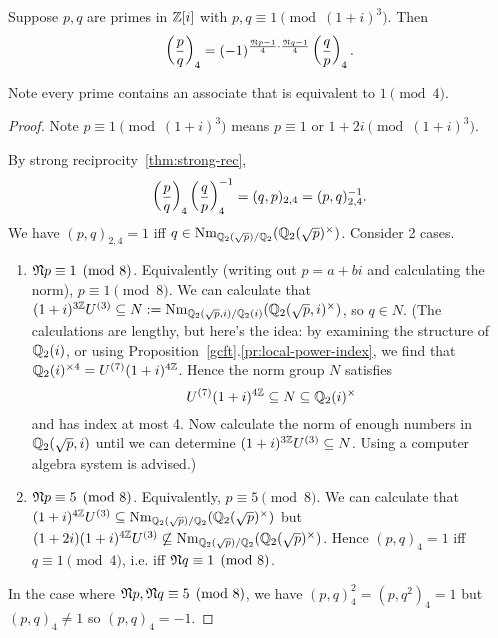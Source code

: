 \begin{thm}
Suppose $p,q$ are primes in $\mathbb{Z}[i]$ with $p,q\equiv 1\pmod{(1+i)^3}$. Then
\[
\left( {\frac{p}{q}} \right)_4=(-1)^{\frac{\mathfrak{N} p-1}{4}\cdot \frac{\mathfrak{N} q-1}{4}}\left( {\frac{q}{p}} \right)_4.
\]
\end{thm}
Note every prime contains an associate that is equivalent to $1\pmod{4}$.
\begin{proof}
Note $p\equiv 1\pmod{(1+i)^3}$ means $p\equiv1$ or $1+2i\pmod{(1+i)^3}$. 

By strong reciprocity~\ref{thm:strong-rec}, 
\[\left( {\frac{p}{q}} \right)_4\left( {\frac{q}{p}} \right)_4^{-1}=(q,p)_{2,4}=(p,q)_{2,4}^{-1}.\]
We have $(p,q)_{2,4}=1$ iff $q\in \operatorname{Nm}_{\mathbb{Q}_2(\sqrt p)/\mathbb{Q}_2}(\mathbb{Q}_2(\sqrt p)^{\times})$. %
Consider 2 cases.
\begin{enumerate}
\item $\mathfrak{N} p\equiv 1\pmod 8$. Equivalently (writing out $p=a+bi$ and calculating the norm), $p\equiv 1\pmod 8$. %
We can calculate %
that $(1+i)^{3\mathbb{Z}}U^{(3)}\subseteq N:=\operatorname{Nm}_{\mathbb{Q}_2(\sqrt p,i)/\mathbb{Q}_2(i)}(\mathbb{Q}_2(\sqrt p,i)^{\times})$, so $q\in N$. (The calculations are lengthy, but here's the idea: by examining the structure of $\mathbb{Q}_2(i)$, or using Proposition~\ref{gcft}.\ref{pr:local-power-index}, we find that $\mathbb{Q}_2(i)^{\times 4}=U^{(7)}(1+i)^{4\mathbb{Z}}$. %
 Hence the norm group $N$ satisfies
\[
U^{(7)}(1+i)^{4\mathbb{Z}}\subseteq N\subseteq \mathbb{Q}_2(i)^{\times}
\]
and has index at most 4. 
Now calculate the norm of enough numbers in $\mathbb{Q}_2(\sqrt p,i)$ until we can determine $(1+i)^{3\mathbb{Z}}U^{(3)}\subseteq N$. Using a computer algebra system is advised.)
\item $\mathfrak{N} p\equiv 5\pmod 8$. Equivalently, $p\equiv 5\pmod 8$. We can calculate that $(1+i)^{4\mathbb{Z}}U^{(3)} \subseteq \operatorname{Nm}_{\mathbb{Q}_2(\sqrt p)/\mathbb{Q}_2}(\mathbb{Q}_2(\sqrt p)^{\times})$ but $(1+2i)(1+i)^{4\mathbb{Z}}U^{(3)} \not\subseteq \operatorname{Nm}_{\mathbb{Q}_2(\sqrt p)/\mathbb{Q}_2}(\mathbb{Q}_2(\sqrt p)^{\times})$. Hence $(p,q)_4=1$ iff $q\equiv 1\pmod 4$, i.e. iff $\mathfrak{N} q\equiv 1\pmod 8$.
\end{enumerate}
In the case where $\mathfrak{N} p,\mathfrak{N} q\equiv 5\pmod 8$, we have $(p,q)_4^2=(p,q^2)_4=1$ but $(p,q)_4\neq 1$ so $(p,q)_4=-1$.
\end{proof}
